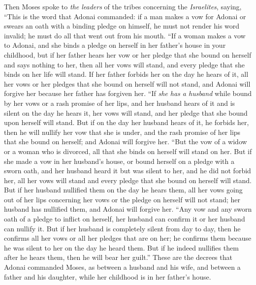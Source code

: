 \begin{biblechapter} %
 Then Moses spoke to \textit{the leaders} of the tribes concerning the \textit{Israelites}, saying, “This is the word that Adonai commanded:
\verse if a man makes a vow for Adonai or swears an oath with a binding pledge on himself, he must not render his word invalid; he must do all that went out from his mouth.
\verse “If a woman makes a vow to Adonai, and she binds a pledge on herself in her father’s house in your childhood,
\verse but if her father hears her vow or her pledge that she bound on herself and says nothing to her, then all her vows will stand, and every pledge that she binds on her life will stand.
\verse If her father forbids her on the day he hears of it, all her vows or her pledges that she bound on herself will not stand, and Adonai will forgive her because her father has forgiven her.
\verse “If \textit{she has a husband} while bound by her vows or a rash promise of her lips,
\verse and her husband hears of it and is silent on the day he hears it, her vows will stand, and her pledge that she bound upon herself will stand.
\verse But if on the day her husband hears of it, he forbids her, then he will nullify her vow that she is under, and the rash promise of her lips that she bound on herself; and Adonai will forgive her.
\verse “But the vow of a widow or a woman who is divorced, all that she binds on herself will stand on her.
\verse But if she made a vow in her husband’s house, or bound herself on a pledge with a sworn oath,
\verse and her husband heard it but was silent to her, and he did not forbid her, all her vows will stand and every pledge that she bound on herself will stand.
\verse But if her husband nullified them on the day he hears them, all her vows going out of her lips concerning her vows or the pledge on herself will not stand; her husband has nullified them, and Adonai will forgive her.
\verse “Any vow and any sworn oath of a pledge to inflict on herself, her husband can confirm it or her husband can nullify it.
\verse But if her husband is completely silent from day to day, then he confirms all her vows or all her pledges that are on her; he confirms them because he was silent to her on the day he heard them.
\verse But if he indeed nullifies them after he hears them, then he will bear her guilt.”
\verse These are the decrees that Adonai commanded Moses, as between a husband and his wife, and between a father and his daughter, while her childhood is in her father’s house.
\end{biblechapter}

